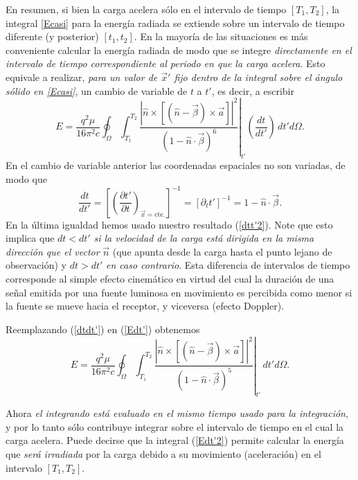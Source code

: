 En resumen, si bien la carga acelera sólo en el intervalo de tiempo $[T_1,T_2]$, la integral \eqref{Ecasi} para la energía radiada se extiende sobre un intervalo de tiempo diferente (y posterior) $[t_1,t_2]$. En la mayoría de las situaciones es más conveniente calcular la energía radiada de modo que se integre \textit{directamente en el intervalo de tiempo correspondiente al periodo en que la carga acelera}. Esto equivale a realizar, \textit{para un valor de $\vec{x}'$ fijo dentro de la integral sobre el ángulo sólido en \eqref{Ecasi}},  un cambio de variable de $t$ a $t'$, es decir, a escribir
\begin{equation}
 E=\frac{q^2\mu}{16\pi^2 c}\oint_\Omega\int_{T_1}^{T_2}\left.\frac{\left|\hat{n}\times
\left[ \left( \hat{n}-\vec{\beta}\right)\times{\vec{a}}\right]\right|^2}{\left(
1-\hat{n}\cdot\vec{\beta}\right) ^{6}}\right|_{t'}\left(\frac{dt}{dt'}\right)\,dt'd\Omega .\label{Edt'}
\end{equation}
En el cambio de variable anterior las coordenadas espaciales no son variadas, de modo que
\begin{equation}
\frac{dt}{dt'}=\left[\left(\frac{\partial t'}{\partial t}\right)_{\vec{x}=\text{cte.}}\right]^{-1}
=\left[\partial_t t'\right]^{-1}=1-\hat{n}\cdot\vec{\beta}. \label{dtdt'}
\end{equation}
En la última igualdad hemos usado nuestro resultado (\ref{dtt'2}). Note que esto implica que $dt<dt'$ \textit{si la velocidad de la carga está dirigida en la misma dirección que el vector} $\vec{n}$ (que apunta desde la carga hasta el punto lejano de observación) y $dt>dt'$ \textit{en caso contrario}. Esta diferencia de intervalos de tiempo corresponde al simple efecto cinemático en virtud del cual  la duración de una señal emitida por una fuente luminosa en movimiento es percibida como menor si la fuente se mueve hacia el receptor, y viceversa (efecto Doppler).

Reemplazando (\ref{dtdt'}) en (\ref{Edt'}) obtenemos
\begin{equation}
 E=\frac{q^2\mu}{16\pi^2 c}\oint_\Omega\int_{T_1}^{T_2}\left.\frac{\left|\hat{n}\times\left[ \left( \hat{n}-\vec{\beta}\right)\times{\vec{a}}\right]\right|^2}{\left(1-\hat{n}\cdot\vec{\beta}\right)^5}\right|_{t'}\,dt'd\Omega .\label{Edt'2}
\end{equation}

Ahora \textit{el integrando está evaluado en el mismo tiempo usado para la integración}, y por lo tanto sólo contribuye integrar sobre el intervalo de tiempo en el cual la carga acelera. Puede decirse que la integral (\ref{Edt'2}) permite calcular la energía que \textit{será irradiada} por la carga debido a su movimiento (aceleración) en el intervalo $[T_1,T_2]$.

